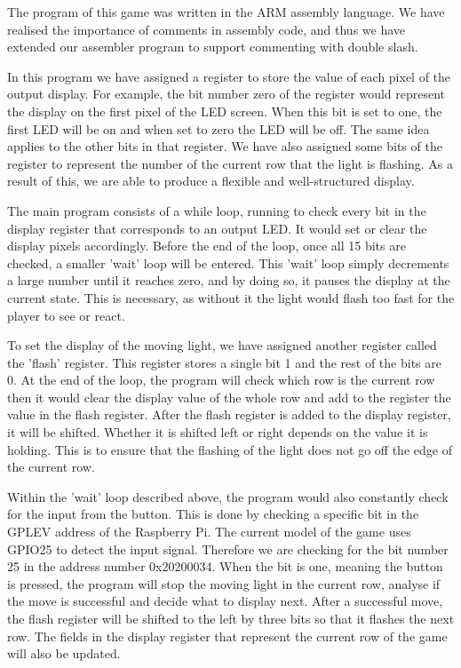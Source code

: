 \documentclass[11pt]{article}
\begin{document}
\medskip

The program of this game was written in the ARM assembly language. We have realised the importance of comments in assembly code, and thus we have extended our assembler program to support commenting with double slash. 

\medskip

In this program we have assigned a register to store the value of each pixel of the output display. For example, the bit number zero of the register would represent the display on the first pixel of the LED screen. When this bit is set to one, the first LED will be on and when set to zero the LED will be off. The same idea applies to the other bits in that register. We have also assigned some bits of the register to represent the number of the current row that the light is flashing. As a result of this, we are able to produce a flexible and well-structured display. 

\medskip

The main program consists of a while loop, running to check every bit in the display register that corresponds to an output LED. It would set or clear the display pixels accordingly. Before the end of the loop, once all 15 bits are checked, a smaller 'wait' loop will be entered. This 'wait' loop simply decrements a large number until it reaches zero, and by doing so, it pauses the display at the current state. This is necessary, as without it the light would flash too fast for the player to see or react. 

\medskip

To set the display of the moving light, we have assigned another register called the 'flash' register. This register stores a single bit 1 and the rest of the bits are 0.  At the end of the loop, the program will check which row is the current row then it would clear the display value of the whole row and add to the register the value in the flash register. After the flash register is added to the display register, it will be shifted. Whether it is shifted left or right depends on the value it is holding. This is to ensure that the flashing of the light does not go off the edge of the current row. 

\medskip

Within the 'wait' loop described above, the program would also constantly check for the input from the button. This is done by checking a specific bit in the GPLEV address of the Raspberry Pi. The current model of the game uses GPIO25 to detect the input signal.  Therefore we are checking for the bit number 25 in the address number 0x20200034. When the bit is one, meaning the button is pressed, the program will stop the moving light in the current row, analyse if the move is successful and decide what to display next. After a successful move, the flash register will be shifted to the left by three bits so that it flashes the next row. The fields in the display register that represent the current row of the game will also be updated. 
\end{document}
